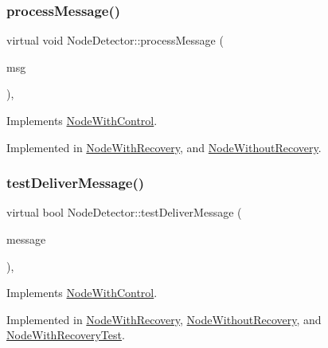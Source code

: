 \subsubsection{\texorpdfstring{process\+Message()}{processMessage()}}
{\footnotesize\ttfamily virtual void Node\+Detector\+::process\+Message (\begin{DoxyParamCaption}\item[{c\+Message $\ast$}]{msg }\end{DoxyParamCaption})\hspace{0.3cm}{\ttfamily [protected]}, {}}



Implements \hyperlink{class_node_with_control_af532082fab76c38d8c50ca90e991f4c3}{Node\+With\+Control}.



Implemented in \hyperlink{class_node_with_recovery_a216c29d76ddb0e94cd5701ff208c7f5b}{Node\+With\+Recovery}, and \hyperlink{class_node_without_recovery_a0b44132b4ebc650399711766cb050399}{Node\+Without\+Recovery}.

\mbox{\label{class_node_detector_a51e7dccd54e94bbe937752ca39dfdba4}} 
\subsubsection{\texorpdfstring{test\+Deliver\+Message()}{testDeliverMessage()}}
{\footnotesize\ttfamily virtual bool Node\+Detector\+::test\+Deliver\+Message (\begin{DoxyParamCaption}\item[{const \hyperlink{structures_8h_a7e7bdc1d2fff8a9436f2f352b2711ed6}{message\+Info} \&}]{message }\end{DoxyParamCaption})\hspace{0.3cm}{\ttfamily [protected]}, {}}



Implements \hyperlink{class_node_with_control_a84df0beabbaed80e7da017d592480515}{Node\+With\+Control}.



Implemented in \hyperlink{class_node_with_recovery_aec147b3723b3dab00f9610453ba8daba}{Node\+With\+Recovery}, \hyperlink{class_node_without_recovery_a8cf83ec6d0af26e385dcde0bc03f5b6d}{Node\+Without\+Recovery}, and \hyperlink{class_node_with_recovery_test_af9b78d0ed4fefb97e2f54c9279aa4655}{Node\+With\+Recovery\+Test}.



